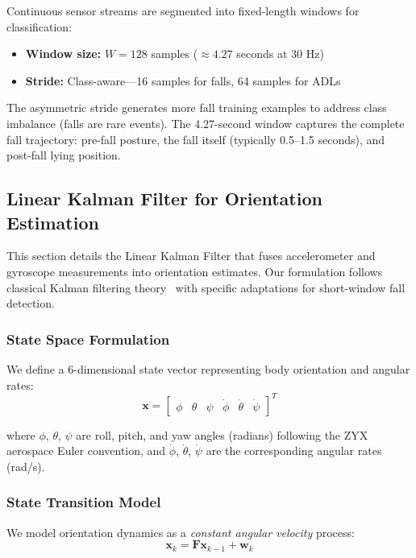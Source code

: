 Continuous sensor streams are segmented into fixed-length windows for classification:
\begin{itemize}
\item \textbf{Window size:} $W = 128$ samples ($\approx 4.27$ seconds at 30 Hz)
\item \textbf{Stride:} Class-aware---16 samples for falls, 64 samples for ADLs
\end{itemize}

The asymmetric stride generates more fall training examples to address class imbalance (falls are rare events). The 4.27-second window captures the complete fall trajectory: pre-fall posture, the fall itself (typically 0.5--1.5 seconds), and post-fall lying position.

\subsection{Linear Kalman Filter for Orientation Estimation}
\label{sec:KalmanFilter}

This section details the Linear Kalman Filter that fuses accelerometer and gyroscope measurements into orientation estimates. Our formulation follows classical Kalman filtering theory~\cite{kalman1960new} with specific adaptations for short-window fall detection.

\subsubsection{State Space Formulation}

We define a 6-dimensional state vector representing body orientation and angular rates:
\begin{equation}
\mathbf{x} = \begin{bmatrix} \phi & \theta & \psi & \dot{\phi} & \dot{\theta} & \dot{\psi} \end{bmatrix}^T
\label{eq:state_vector}
\end{equation}

where $\phi$, $\theta$, $\psi$ are roll, pitch, and yaw angles (radians) following the ZYX aerospace Euler convention, and $\dot{\phi}$, $\dot{\theta}$, $\dot{\psi}$ are the corresponding angular rates (rad/s).

\subsubsection{State Transition Model}

We model orientation dynamics as a \textit{constant angular velocity} process:
\begin{equation}
\mathbf{x}_{k} = \mathbf{F} \mathbf{x}_{k-1} + \mathbf{w}_{k}
\label{eq:state_transition}
\end{equation}

